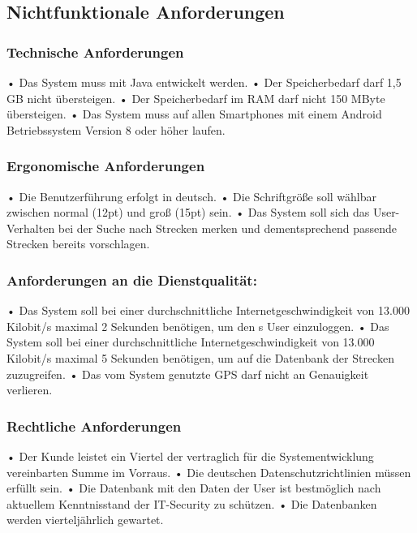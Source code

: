 \documentclass[a4paper, 12pt]{article}
\begin{document}
\subsection{Nichtfunktionale Anforderungen}
\subsubsection{Technische Anforderungen}
\label{technAnf}
• Das System muss mit Java entwickelt werden.\newline
• Der Speicherbedarf darf 1,5 GB nicht übersteigen.\newline
• Der Speicherbedarf im RAM darf nicht 150 MByte übersteigen.\newline
• Das System muss auf allen Smartphones mit einem Android Betriebssystem Version 8 oder höher laufen.
\subsubsection{Ergonomische Anforderungen}
• Die Benutzerführung erfolgt in deutsch.\newline
\label{Lesbarkeit}
• Die Schriftgröße soll wählbar zwischen normal (12pt) und groß (15pt) sein.\newline
\label{Vorschlaege}
• Das System soll sich das User-Verhalten bei der Suche nach Strecken merken und dementsprechend passende Strecken bereits vorschlagen.
\subsubsection{Anforderungen an die Dienstqualität:}
\label{Warten}
• Das System soll bei einer durchschnittliche Internetgeschwindigkeit von 13.000 Kilobit/s maximal 2 Sekunden benötigen, um den s User einzuloggen.\newline
• Das System soll bei einer durchschnittliche Internetgeschwindigkeit von 13.000 Kilobit/s maximal 5 Sekunden benötigen, um auf die Datenbank der Strecken zuzugreifen.\newline
• Das vom System genutzte GPS darf nicht an Genauigkeit verlieren.
\subsubsection{Rechtliche Anforderungen}
• Der Kunde leistet ein Viertel der vertraglich für die Systementwicklung vereinbarten Summe im Vorraus.\newline
\label{Datenschutz}
• Die deutschen Datenschutzrichtlinien müssen erfüllt sein.\newline
\label{Sicherheit}
• Die Datenbank mit den Daten der User ist bestmöglich nach aktuellem Kenntnisstand der IT-Security zu schützen.\newline
• Die Datenbanken werden vierteljährlich gewartet.
\end{document}
